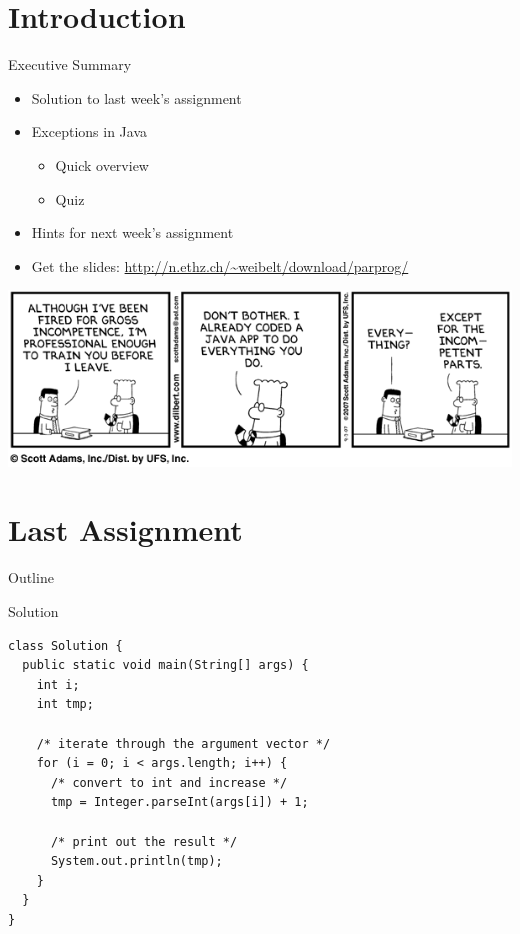 \note{
}


\section*{Introduction}

\begin{frame}{Executive Summary}
  \begin{itemize}
  \item Solution to last week's assignment
  \item Exceptions in Java
    \begin{itemize}
    \item Quick overview
    \item Quiz
    \end{itemize}
  \item Hints for next week's assignment
  \item Get the slides:
    \url{http://n.ethz.ch/~weibelt/download/parprog/}
  \end{itemize}



  \begin{center}
    \includegraphics[scale=0.45]{figures/dilbert-1}
  \end{center}
\end{frame}


\section{Last Assignment}

\begin{frame}{Outline}
  \tableofcontents[current]
\end{frame}

\begin{frame}[fragile]{Solution}
  \begin{lstlisting}
class Solution {
  public static void main(String[] args) {
    int i;
    int tmp;
    
    /* iterate through the argument vector */
    for (i = 0; i < args.length; i++) {
      /* convert to int and increase */
      tmp = Integer.parseInt(args[i]) + 1;
      
      /* print out the result */
      System.out.println(tmp); 
    }
  }	
}
  \end{lstlisting}
\end{frame}

